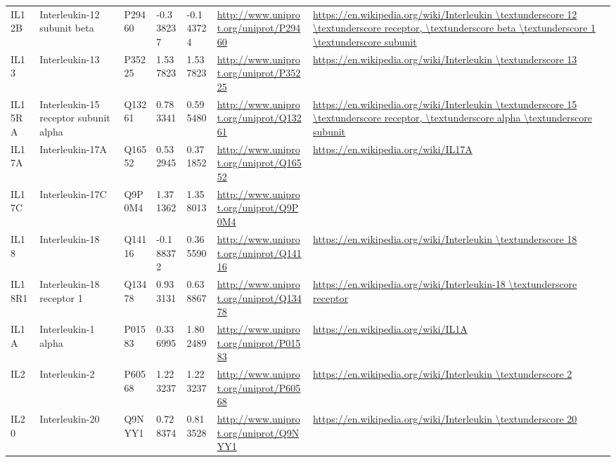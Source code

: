 \begin{table}[H]
{\begin{tabular}{ lllllll }
        \multicolumn{1}{l|}{ IL12B } &  Interleukin-12 subunit beta   & P29460   & -0.338237   & -0.143724   & \url{http://www.uniprot.org/uniprot/P29460}   & \url{https://en.wikipedia.org/wiki/Interleukin \textunderscore 12 \textunderscore receptor, \textunderscore beta \textunderscore 1 \textunderscore subunit}          \\ 
        \multicolumn{1}{l|}{ IL13 } &  Interleukin-13   & P35225   & 1.537823   & 1.537823   & \url{http://www.uniprot.org/uniprot/P35225}   & \url{https://en.wikipedia.org/wiki/Interleukin \textunderscore 13}          \\ 
        \multicolumn{1}{l|}{ IL15RA } &  Interleukin-15 receptor subunit alpha   & Q13261   & 0.783341   & 0.595480   & \url{http://www.uniprot.org/uniprot/Q13261}   & \url{https://en.wikipedia.org/wiki/Interleukin \textunderscore 15 \textunderscore receptor, \textunderscore alpha \textunderscore subunit}          \\ 
        \multicolumn{1}{l|}{ IL17A } &  Interleukin-17A   & Q16552   & 0.532945   & 0.371852   & \url{http://www.uniprot.org/uniprot/Q16552}   & \url{https://en.wikipedia.org/wiki/IL17A}          \\ 
        \multicolumn{1}{l|}{ IL17C } &  Interleukin-17C   & Q9P0M4   & 1.371362   & 1.358013   & \url{http://www.uniprot.org/uniprot/Q9P0M4}   &           \\ 
        \multicolumn{1}{l|}{ IL18 } &  Interleukin-18   & Q14116   & -0.188372   & 0.365590   & \url{http://www.uniprot.org/uniprot/Q14116}   & \url{https://en.wikipedia.org/wiki/Interleukin \textunderscore 18}          \\ 
        \multicolumn{1}{l|}{ IL18R1 } &  Interleukin-18 receptor 1   & Q13478   & 0.933131   & 0.638867   & \url{http://www.uniprot.org/uniprot/Q13478}   & \url{https://en.wikipedia.org/wiki/Interleukin-18 \textunderscore receptor}          \\ 
        \multicolumn{1}{l|}{ IL1A } &  Interleukin-1 alpha   & P01583   & 0.336995   & 1.802489   & \url{http://www.uniprot.org/uniprot/P01583}   & \url{https://en.wikipedia.org/wiki/IL1A}          \\ 
        \multicolumn{1}{l|}{ IL2 } &  Interleukin-2   & P60568   & 1.223237   & 1.223237   & \url{http://www.uniprot.org/uniprot/P60568}   & \url{https://en.wikipedia.org/wiki/Interleukin \textunderscore 2}          \\ 
        \multicolumn{1}{l|}{ IL20 } &  Interleukin-20   & Q9NYY1   & 0.728374   & 0.813528   & \url{http://www.uniprot.org/uniprot/Q9NYY1}   & \url{https://en.wikipedia.org/wiki/Interleukin \textunderscore 20}          \\ 

\end{tabular}}
\end{table}
